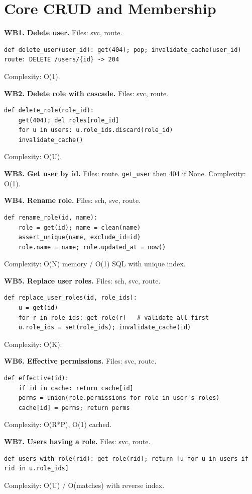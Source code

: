 \documentclass[11pt,a4paper]{report}
\begin{document}
\section{Core CRUD and Membership}

\textbf{WB1. Delete user.} Files: svc, route.
\begin{lstlisting}
def delete_user(user_id): get(404); pop; invalidate_cache(user_id)
route: DELETE /users/{id} -> 204
\end{lstlisting}
Complexity: O(1).

\textbf{WB2. Delete role with cascade.} Files: svc, route.
\begin{lstlisting}
def delete_role(role_id):
    get(404); del roles[role_id]
    for u in users: u.role_ids.discard(role_id)
    invalidate_cache()
\end{lstlisting}
Complexity: O(U).

\textbf{WB3. Get user by id.} Files: route. \texttt{get\_user} then 404 if None.
Complexity: O(1).

\textbf{WB4. Rename role.} Files: sch, svc, route.
\begin{lstlisting}
def rename_role(id, name):
    role = get(id); name = clean(name)
    assert_unique(name, exclude_id=id)
    role.name = name; role.updated_at = now()
\end{lstlisting}
Complexity: O(N) memory / O(1) SQL with unique index.

\textbf{WB5. Replace user roles.} Files: sch, svc, route.
\begin{lstlisting}
def replace_user_roles(id, role_ids):
    u = get(id)
    for r in role_ids: get_role(r)   # validate all first
    u.role_ids = set(role_ids); invalidate_cache(id)
\end{lstlisting}
Complexity: O(K).

\textbf{WB6. Effective permissions.} Files: svc, route.
\begin{lstlisting}
def effective(id):
    if id in cache: return cache[id]
    perms = union(role.permissions for role in user's roles)
    cache[id] = perms; return perms
\end{lstlisting}
Complexity: O(R*P), O(1) cached.

\textbf{WB7. Users having a role.} Files: svc, route.
\begin{lstlisting}
def users_with_role(rid): get_role(rid); return [u for u in users if rid in u.role_ids]
\end{lstlisting}
Complexity: O(U) / O(matches) with reverse index.
\end{document}
